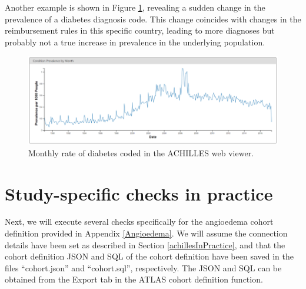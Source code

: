 \documentclass[11pt]{book}
\newenvironment{Shaded}{\begin{snugshade}}{\end{snugshade}}
\newcommand{\DataTypeTok}[1]{\textcolor[rgb]{0.13,0.29,0.53}{#1}}
\newcommand{\KeywordTok}[1]{\textcolor[rgb]{0.13,0.29,0.53}{\textbf{#1}}}
\newcommand{\NormalTok}[1]{#1}
\newcommand{\OperatorTok}[1]{\textcolor[rgb]{0.81,0.36,0.00}{\textbf{#1}}}
\newcommand{\StringTok}[1]{\textcolor[rgb]{0.31,0.60,0.02}{#1}}
\theoremstyle{definition}
\theoremstyle{definition}
\theoremstyle{definition}
\theoremstyle{remark}
\begin{document}
Another example is shown in Figure \ref{fig:achillesCodeChange}, revealing a sudden change in the prevalence of a diabetes diagnosis code. This change coincides with changes in the reimbursement rules in this specific country, leading to more diagnoses but probably not a true increase in prevalence in the underlying population.

\begin{figure}

{\centering \includegraphics[width=1\linewidth]{images/DataQuality/achillesCodeChange} 

}

\caption{Monthly rate of diabetes coded in the ACHILLES web viewer.}\label{fig:achillesCodeChange}
\end{figure}

\hypertarget{study-specific-checks-in-practice}{%
\section{Study-specific checks in practice}\label{study-specific-checks-in-practice}}

Next, we will execute several checks specifically for the angioedema cohort definition provided in Appendix \ref{Angioedema}. We will assume the connection details have been set as described in Section \ref{achillesInPractice}, and that the cohort definition JSON and SQL of the cohort definition have been saved in the files ``cohort.json'' and ``cohort.sql'', respectively. The JSON and SQL can be obtained from the Export tab in the ATLAS cohort definition function.

\begin{Shaded}
\end{Shaded}
\end{document}
